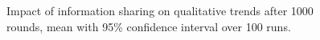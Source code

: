\begin{figure}[H]
\begin{adjustbox}{center}\end{adjustbox}
\caption{Impact of information sharing on qualitative trends after 1000 rounds, mean with 95\% confidence interval over 100 runs.}
\label{fig:sharing_trends}
\end{figure}


